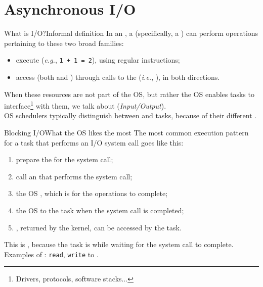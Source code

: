 
\section{Asynchronous I/O}
\graphicspath{{figs/section1/}}

\begin{frame}{What is I/O?}{Informal definition}
  In an , a  (specifically, a ) can perform operations pertaining to these two broad families:
  \begin{itemize}
    \item execute  (\emph{e.g.}, \texttt{1 + 1 = 2}), using regular  instructions;
    \item access  (both  and ) through calls to the  (\emph{i.e.}, ),  in both directions.
  \end{itemize}
  When these resources are not part of the OS, but rather the OS enables tasks to interface\footnote{Drivers, protocols, software stacks...} with them, we talk about  (\emph{Input/Output}).\\
  \bigskip
  OS schedulers typically distinguish between  and  tasks, because of their different .
\end{frame}

\begin{frame}{Blocking I/O}{What the OS likes the most}
  The most common execution pattern for a task that performs an I/O system call goes like this:
  \begin{enumerate}
    \item prepare the  for the system call;
    \item call an  that performs the system call;
    \item the OS , which is  for the operations to complete;
    \item the OS  to the task when the system call is completed;
    \item {}, returned by the kernel, can be accessed by the task.
  \end{enumerate}
  This is , because the task is  while waiting for the system call to complete.\\
  \bigskip
  Examples of : \texttt{read}, \texttt{write} to .
\end{frame}

